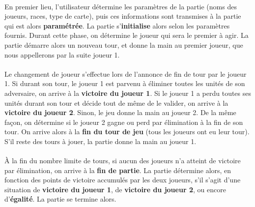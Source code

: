 \documentclass[a4paper]{article}
\begin{document}
\paragraph{}
En premier lieu, l'utilisateur détermine les paramètres de la partie (noms des joueurs, races, type de carte), puis ces informations sont transmises à la partie qui est alors \textbf{paramétrée}. La partie s'\textbf{initialise} alors selon les paramètres fournis. Durant cette phase, on détermine le joueur qui sera le premier à agir. La partie démarre alors un nouveau tour, et donne la main au premier joueur, que nous appellerons par la suite joueur 1.

\paragraph{}
Le changement de joueur s'effectue lors de l'annonce de fin de tour par le joueur 1. Si durant son tour, le joueur 1 est parvenu à éliminer toutes les unités de son adversaire, on arrive à la \textbf{victoire du joueur 1}. Si le joueur 1 a perdu toutes ses unités durant son tour et décide tout de même de le valider, on arrive à la \textbf{victoire du joueur 2}. Sinon, le jeu donne la main au joueur 2. De la même façon, on détermine si le joueur 2 gagne ou perd par élimination à la fin de son tour. On arrive alors à la \textbf{fin du tour de jeu} (tous les joueurs ont eu leur tour). S'il reste des tours à jouer, la partie donne la main au joueur 1.

\paragraph{}
À la fin du nombre limite de tours, si aucun des joueurs n'a atteint de victoire par élimination, on arrive à la \textbf{fin de partie}. La partie détermine alors, en fonction des points de victoire accumulés par les deux joueurs, s'il s'agit d'une situation de \textbf{victoire du joueur 1}, de \textbf{victoire du joueur 2}, ou encore d'\textbf{égalité}. La partie se termine alors.


\end{document}

